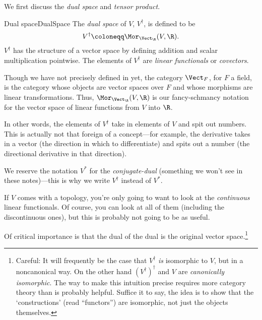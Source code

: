 We first discuss the \emph{dual space} and \emph{tensor product}.
\begin{dfn}{Dual space}{DualSpace}
The \emph{dual space} of $V$, $V^{\dagger}$, is defined to be
\begin{equation}
V^{\dagger}\coloneqq \Mor _{\Vect _{\R}}(V,\R ).
\end{equation}
$V^{\dagger}$ has the structure of a vector space by defining addition and scalar multiplication pointwise.  The elements of $V^{\dagger}$ are \emph{linear functionals} or \emph{covectors}.
\begin{rmk}
Though we have not precisely defined in yet, the category $\Vect _F$, for $F$ a field, is the category whose objects are vector spaces over $F$ and whose morphisms are linear transformations.  Thus, $\Mor _{\Vect _{\R}}(V,\R )$ is our fancy-schmancy notation for the vector space of linear functions from $V$ into $\R$.
\end{rmk}
\begin{rmk}
In other words, the elements of $V^{\dagger}$ take in elements of $V$ and spit out numbers.  This is actually not that foreign of a concept---for example, the derivative takes in a vector (the direction in which to differentiate) and spits out a number (the directional derivative in that direction).
\end{rmk}
\begin{rmk}
We reserve the notation $V^*$ for the \emph{conjugate-dual} (something we won't see in these notes)---this is why we write $V^{\dagger}$ instead of $V^*$.
\end{rmk}
\begin{rmk}
If $V$ comes with a topology, you're only going to want to look at the \emph{continuous} linear functionals.  Of course, you can look at all of them (including the discontinuous ones), but this is probably not going to be as useful.
\end{rmk}
\end{dfn}
Of critical importance is that the dual of the dual is the original vector space.\footnote{Careful:  It will frequently be the case that $V^{\dagger}$ \emph{is} isomorphic to $V$, but in a noncanonical way.  On the other hand $(V^{\dagger})^{\dagger}$ and $V$ are \emph{canonically isomorphic}.  The way to make this intuition precise requires more category theory than is probably helpful.  Suffice it to say, the idea is to show that the `constructions' (read ``functors'') are isomorphic, not just the objects themselves.}
